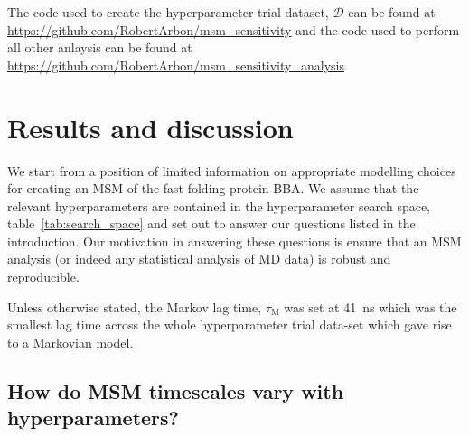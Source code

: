 \documentclass[journal=jacsat,manuscript=article]{achemso}
\begin{document}
The code used to create the hyperparameter trial dataset, $\mathcal{D}$ can be found at \url{https://github.com/RobertArbon/msm_sensitivity} and the code used to perform all other anlaysis can be found at \url{https://github.com/RobertArbon/msm_sensitivity_analysis}.  

\section{Results and discussion}

We start from a position of limited information on appropriate modelling choices for creating an MSM of the fast folding protein BBA.  We assume that the
relevant hyperparameters are contained in the  hyperparameter search space, table~\ref{tab:search_space} and set out to answer our questions listed in the introduction.  Our motivation in answering these questions is ensure that an MSM analysis (or indeed any statistical analysis of MD data) is robust and reproducible.  

Unless otherwise stated, the Markov lag time, $\tau_{\mathrm{M}}$ was set at \SI{41}{\nano\second} which was the smallest lag time across the whole hyperparameter trial data-set which gave rise to a Markovian model.  

\subsection{How do MSM timescales vary with hyperparameters?}
\end{document}
